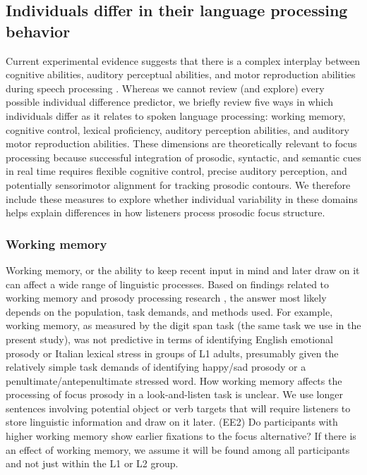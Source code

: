 \subsection{Individuals differ in their language processing behavior}
Current experimental evidence suggests that there is a complex interplay between cognitive abilities, auditory perceptual abilities, and motor reproduction abilities during speech processing \parencite{saito2022does, bramlett_wiener_24_speechprosody, bakkouche2025effects, Kachlicka_Saito_Tierney_2019}. Whereas we cannot review (and explore) every possible individual difference predictor, we briefly review five ways in which individuals differ as it relates to spoken language processing: working memory, cognitive control, lexical proficiency, auditory perception abilities, and auditory motor reproduction abilities. These dimensions are theoretically relevant to focus processing because successful integration of prosodic, syntactic, and semantic cues in real time requires flexible cognitive control, precise auditory perception, and potentially sensorimotor alignment for tracking prosodic contours. We therefore include these measures to explore whether individual variability in these domains helps explain differences in how listeners process prosodic focus structure.


\subsubsection{Working memory}
Working memory, or the ability to keep recent input in mind and later draw on it \parencite[see][]{baddeley2003working,carpenter2013role} can affect a wide range of linguistic processes. Based on findings related to working memory and prosody processing research \parencite[e.g.,][]{traxler2009hierarchical,ferreira2015prosody, bishop2021exploring}, the answer most likely depends on the population, task demands, and methods used. For example, working memory, as measured by the digit span task (the same task we use in the present study), was not predictive in terms of identifying English emotional prosody \parencite{sinagra2022perception} or Italian lexical stress \parencite{ppcc} in groups of L1 adults, presumably given the relatively simple task demands of identifying happy/sad prosody or a penultimate/antepenultimate stressed word. How working memory affects the processing of focus prosody in a look-and-listen task is unclear. We use longer sentences involving potential object or verb targets that will require listeners to store linguistic information and draw on it later. (EE2) Do participants with higher working memory show earlier fixations to the focus alternative? If there is an effect of working memory, we assume it will be found among all participants and not just within the L1 or L2 group.


